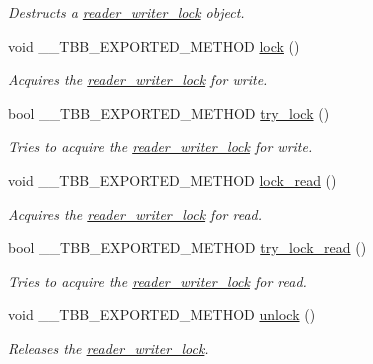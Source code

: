 \begin{DoxyCompactItemize}
\begin{DoxyCompactList}\small\item\em Destructs a \hyperlink{classtbb_1_1interface5_1_1reader__writer__lock}{reader\+\_\+writer\+\_\+lock} object. \end{DoxyCompactList}\item 
void \+\_\+\+\_\+\+T\+B\+B\+\_\+\+E\+X\+P\+O\+R\+T\+E\+D\+\_\+\+M\+E\+T\+H\+O\+D \hyperlink{classtbb_1_1interface5_1_1reader__writer__lock_a2368b20444e310be9f8f3cf24337acc7}{lock} ()
\begin{DoxyCompactList}\small\item\em Acquires the \hyperlink{classtbb_1_1interface5_1_1reader__writer__lock}{reader\+\_\+writer\+\_\+lock} for write. \end{DoxyCompactList}\item 
bool \+\_\+\+\_\+\+T\+B\+B\+\_\+\+E\+X\+P\+O\+R\+T\+E\+D\+\_\+\+M\+E\+T\+H\+O\+D \hyperlink{classtbb_1_1interface5_1_1reader__writer__lock_adea99248bc11b4bdac946edb72781f98}{try\+\_\+lock} ()
\begin{DoxyCompactList}\small\item\em Tries to acquire the \hyperlink{classtbb_1_1interface5_1_1reader__writer__lock}{reader\+\_\+writer\+\_\+lock} for write. \end{DoxyCompactList}\item 
void \+\_\+\+\_\+\+T\+B\+B\+\_\+\+E\+X\+P\+O\+R\+T\+E\+D\+\_\+\+M\+E\+T\+H\+O\+D \hyperlink{classtbb_1_1interface5_1_1reader__writer__lock_ad4c8eb4cb105c0e8df6dad7ee81c306b}{lock\+\_\+read} ()
\begin{DoxyCompactList}\small\item\em Acquires the \hyperlink{classtbb_1_1interface5_1_1reader__writer__lock}{reader\+\_\+writer\+\_\+lock} for read. \end{DoxyCompactList}\item 
bool \+\_\+\+\_\+\+T\+B\+B\+\_\+\+E\+X\+P\+O\+R\+T\+E\+D\+\_\+\+M\+E\+T\+H\+O\+D \hyperlink{classtbb_1_1interface5_1_1reader__writer__lock_ad35e891c521b4be7a5397db241d50784}{try\+\_\+lock\+\_\+read} ()
\begin{DoxyCompactList}\small\item\em Tries to acquire the \hyperlink{classtbb_1_1interface5_1_1reader__writer__lock}{reader\+\_\+writer\+\_\+lock} for read. \end{DoxyCompactList}\item 
\hypertarget{classtbb_1_1interface5_1_1reader__writer__lock_ad2567a723d160b812f2a637e12e3091a}{}void \+\_\+\+\_\+\+T\+B\+B\+\_\+\+E\+X\+P\+O\+R\+T\+E\+D\+\_\+\+M\+E\+T\+H\+O\+D \hyperlink{classtbb_1_1interface5_1_1reader__writer__lock_ad2567a723d160b812f2a637e12e3091a}{unlock} ()\label{classtbb_1_1interface5_1_1reader__writer__lock_ad2567a723d160b812f2a637e12e3091a}

\begin{DoxyCompactList}\small\item\em Releases the \hyperlink{classtbb_1_1interface5_1_1reader__writer__lock}{reader\+\_\+writer\+\_\+lock}. \end{DoxyCompactList}\end{DoxyCompactItemize}
